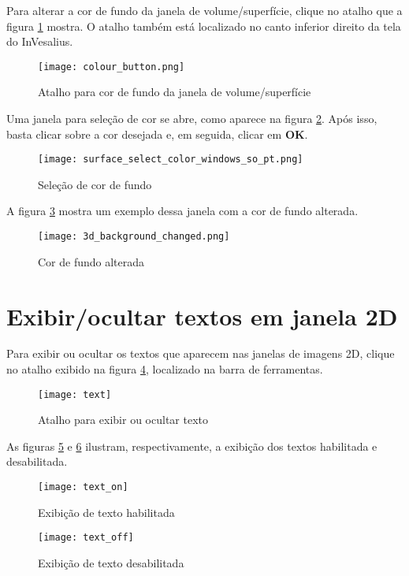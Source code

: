 Para alterar a cor de fundo da janela de volume/superfície, clique no atalho que a figura
\ref{fig:button_select_color_2} mostra. O atalho também está localizado no canto inferior
direito da tela do InVesalius.

\begin{figure}[!htb]
\centering
\texttt{[image: colour\_button.png]}
\caption{Atalho para cor de fundo da janela de volume/superfície}
\label{fig:button_select_color_2}
\end{figure}

Uma janela para seleção de cor se abre, como aparece na figura \ref{fig:color_window_background}.
Após isso, basta clicar sobre a cor desejada e, em seguida, clicar em \textbf{OK}.

\begin{figure}[!htb]
\centering
\texttt{[image: surface\_select\_color\_windows\_so\_pt.png]}
\caption{Seleção de cor de fundo}
\label{fig:color_window_background}
\end{figure}

A figura \ref{fig:background_color} mostra um exemplo dessa janela com a cor de fundo alterada.

\begin{figure}[!htb]
\centering
\texttt{[image: 3d\_background\_changed.png]}
\caption{Cor de fundo alterada}
\label{fig:background_color}
\end{figure}

\newpage

\section{Exibir/ocultar textos em janela 2D}

Para exibir ou ocultar os textos que aparecem nas janelas de imagens 2D, clique no atalho
exibido na figura \ref{fig:text}, localizado na barra de ferramentas.

\begin{figure}[!htb]
\centering
\texttt{[image: text]}
\caption{Atalho para exibir ou ocultar texto}
\label{fig:text}
\end{figure}

As figuras \ref{fig:text_on} e \ref{fig:text_off} ilustram, respectivamente, a exibição
dos textos habilitada e desabilitada.

\begin{figure}[!htb]
\centering
\texttt{[image: text\_on]}
\caption{Exibição de texto habilitada}
\label{fig:text_on}
\end{figure}

\begin{figure}[!htb]
\centering
\texttt{[image: text\_off]}
\caption{Exibição de texto desabilitada}
\label{fig:text_off}
\end{figure}
